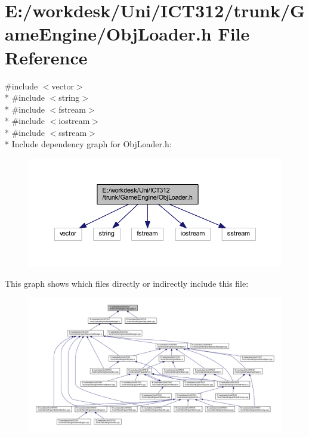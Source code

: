 \section{E\+:/workdesk/\+Uni/\+I\+C\+T312/trunk/\+Game\+Engine/\+Obj\+Loader.h File Reference}
\label{_obj_loader_8h}
{\ttfamily \#include $<$vector$>$}\\*
{\ttfamily \#include $<$string$>$}\\*
{\ttfamily \#include $<$fstream$>$}\\*
{\ttfamily \#include $<$iostream$>$}\\*
{\ttfamily \#include $<$sstream$>$}\\*
Include dependency graph for Obj\+Loader.\+h\+:\nopagebreak
\begin{figure}[H]
\begin{center}
\leavevmode
\includegraphics[width=350pt]{dd/d68/_obj_loader_8h__incl}
\end{center}
\end{figure}
This graph shows which files directly or indirectly include this file\+:
\nopagebreak
\begin{figure}[H]
\begin{center}
\leavevmode
\includegraphics[width=350pt]{d2/dad/_obj_loader_8h__dep__incl}
\end{center}
\end{figure}
